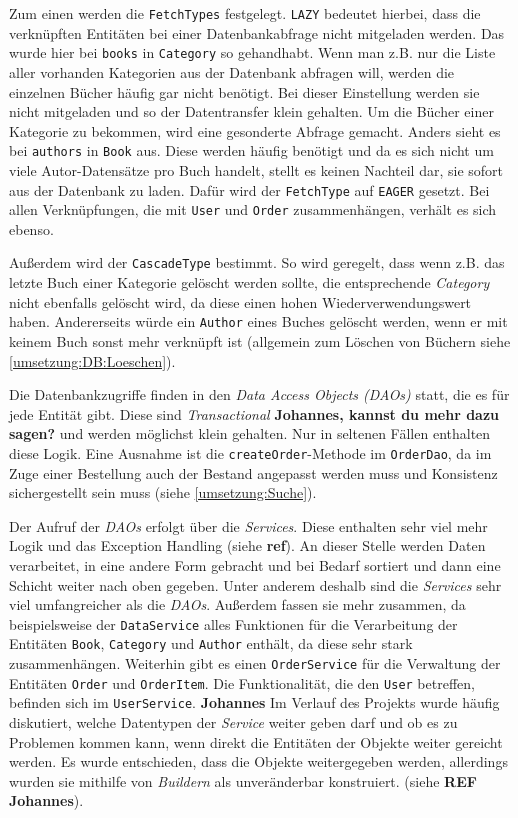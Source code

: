 		Zum einen werden die \texttt{FetchTypes} festgelegt. \texttt{LAZY} bedeutet hierbei, dass die verknüpften Entitäten bei einer Datenbankabfrage nicht mitgeladen werden. Das wurde hier bei \texttt{books} in \texttt{Category} so gehandhabt. Wenn man z.B. nur die Liste aller vorhanden Kategorien aus der Datenbank abfragen will, werden die einzelnen Bücher häufig gar nicht benötigt. Bei dieser Einstellung werden sie nicht mitgeladen und so der Datentransfer klein gehalten. Um die Bücher einer Kategorie zu bekommen, wird eine gesonderte Abfrage gemacht. Anders sieht es bei \texttt{authors} in \texttt{Book} aus. Diese werden häufig benötigt und da es sich nicht um viele Autor-Datensätze pro Buch handelt, stellt es keinen Nachteil dar, sie sofort aus der Datenbank zu laden. Dafür wird der \texttt{FetchType} auf \texttt{EAGER} gesetzt. Bei allen Verknüpfungen, die mit \texttt{User} und \texttt{Order} zusammenhängen, verhält es sich ebenso.
		
		Außerdem wird der \texttt{CascadeType} bestimmt. So wird geregelt, dass wenn z.B. das letzte Buch einer Kategorie gelöscht werden sollte, die entsprechende \textit{Category} nicht ebenfalls gelöscht wird, da diese einen hohen Wiederverwendungswert haben. Andererseits würde ein \texttt{Author} eines Buches gelöscht werden, wenn er mit keinem Buch sonst mehr verknüpft ist (allgemein zum Löschen von Büchern siehe \ref{umsetzung:DB:Loeschen}).
		
		Die Datenbankzugriffe finden in den \textit{Data Access Objects (DAOs)} statt, die es für jede Entität gibt. Diese sind \textit{Trans\-actio\-nal} \textbf{Johannes, kannst du mehr dazu sagen?} und werden möglichst klein gehalten. Nur in seltenen Fällen enthalten diese Logik. Eine Ausnahme ist die \texttt{createOrder}-Methode im \texttt{OrderDao}, da im Zuge einer Bestellung auch der Bestand angepasst werden muss und Konsistenz sichergestellt sein muss (siehe \ref{umsetzung:Suche}).
		
		Der Aufruf der \textit{DAOs} erfolgt über die \textit{Services}. Diese enthalten sehr viel mehr Logik und das Exception Handling (siehe \textbf{ref}). An dieser Stelle werden Daten verarbeitet, in eine andere Form gebracht und bei Bedarf sortiert und dann eine Schicht weiter nach oben gegeben. Unter anderem deshalb sind die \textit{Services} sehr viel umfangreicher als die \textit{DAOs}. Außerdem fassen sie mehr zusammen, da beispielsweise der \texttt{DataService} alles Funktionen für die Verarbeitung der Entitäten \texttt{Book}, \texttt{Category} und \texttt{Author} enthält, da diese sehr stark zusammenhängen. Weiterhin gibt es einen \texttt{OrderService} für die Verwaltung der Entitäten \texttt{Order} und \texttt{OrderItem}. Die Funktionalität, die den \texttt{User} betreffen, befinden sich im \texttt{UserService}. \textbf{Johannes} Im Verlauf des Projekts wurde häufig diskutiert, welche Datentypen der \textit{Service} weiter geben darf und ob es zu Problemen kommen kann, wenn direkt die Entitäten der Objekte weiter gereicht werden. Es wurde entschieden, dass die Objekte weitergegeben werden, allerdings wurden sie mithilfe von \textit{Buildern} als unveränderbar konstruiert. (siehe \textbf{REF Johannes}).
		 
